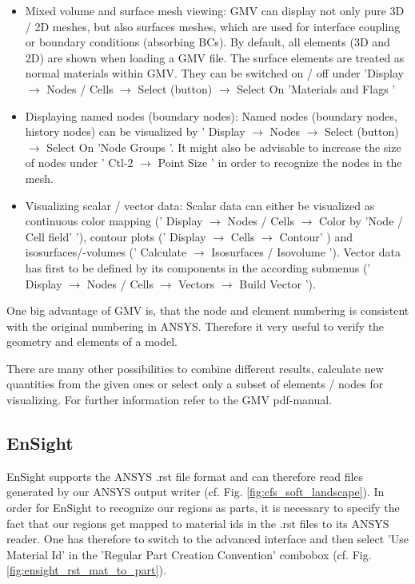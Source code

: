\begin{itemize}
    \item Mixed volume and surface mesh viewing: GMV can display not only pure
3D  / 2D  meshes,  but also  surfaces  meshes, which  are  used for  interface
coupling or boundary conditions (absorbing  BCs). By default, all elements (3D
and 2D) are shown when loading a GMV file. The surface elements are treated as
normal materials  within GMV.  They can  be switched on  / off  under 'Display
$\rightarrow$ Nodes / Cells $\rightarrow$ Select (button) $\rightarrow$ Select
On 'Materials and Flags '
    \item  Displaying  named nodes  (boundary  nodes):  Named nodes  (boundary
nodes,  history nodes)  can be  visualized  by '  Display $\rightarrow$  Nodes
$\rightarrow$ Select (button) $\rightarrow$ Select On 'Node Groups '. It might
also be  advisable to increase the  size of nodes under  ' Ctl-2 $\rightarrow$
Point Size ' in order to recognize the nodes in the mesh.
    \item  Visualizing  scalar  /  vector  data: Scalar  data  can  either  be
visualized as continuous color mapping  (' Display $\rightarrow$ Nodes / Cells
$\rightarrow$  Color by  'Node  / Cell  field'  '), contour  plots ('  Display
$\rightarrow$  Cells  $\rightarrow$  Contour'  ) and  isosurfaces/-volumes  ('
Calculate $\rightarrow$ Isosurfaces  / Isovolume '). Vector data  has first to
be  defined   by  its  components   in  the  according  submenus   ('  Display
$\rightarrow$ Nodes  / Cells $\rightarrow$ Vectors  $\rightarrow$ Build Vector
').
\end{itemize}

One big advantage of GMV is, that the node and element numbering is consistent
with the original  numbering in ANSYS. Therefore it very  useful to verify the
geometry and elements of a model.

There are many other possibilities to combine different results, calculate new
quantities from the given ones or select only a subset of elements / nodes for
visualizing.  For further  information refer  to the  GMV  pdf-manual.


\subsection{EnSight}
\label{sec:postproc_ensight} EnSight  supports the ANSYS .rst  file format and
can  therefore read  files generated  by our  ANSYS output  writer  (cf.  Fig.
\ref{fig:cfs_soft_landscape}).  In order for  EnSight to recognize our regions
as parts, it is  necessary to specify the fact that our  regions get mapped to
material ids  in the  .rst files to  its ANSYS  reader.  One has  therefore to
switch to  the advanced  interface and  then select 'Use  Material Id'  in the
'Regular          Part          Creation         Convention'          combobox
(cf. Fig. \ref{fig:ensight_rst_mat_to_part}).

